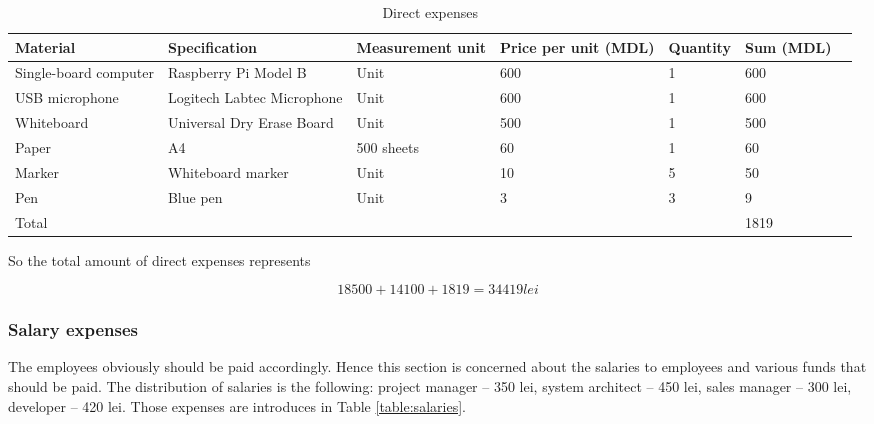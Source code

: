 \begin{table}[!ht]
\begin{center}
\caption{Direct expenses}
\begin{tabularx}{\textwidth}{| M{5em} | Y | M{7em} | M{5em} | M{5em} | M{5em} |N}
\hline
\textbf{Material} & \textbf{Specification} & \textbf{Measurement unit} & \textbf{Price per unit (MDL)} & \textbf{Quantity} & \textbf{Sum (MDL)} &\\[18pt]
\hline
Single-board computer & Raspberry Pi Model B  & Unit & 600 & 1 & 600 &\\[14pt]
\hline
USB microphone & Logitech Labtec Microphone & Unit & 600 & 1 & 600 &\\[14pt]
\hline
Whiteboard & Universal Dry Erase Board & Unit & 500 & 1 & 500 &\\[14pt]
\hline
Paper & A4 & 500 sheets & 60 & 1 & 60 &\\[14pt]
\hline
Marker & Whiteboard marker & Unit & 10 & 5 & 50 &\\[14pt]
\hline
Pen & Blue pen & Unit & 3 & 3 & 9 &\\[14pt]
\hline
Total & & & & & 1819 &\\[14pt]
\hline
\end{tabularx}
\label{table:direct_expenses}
\end{center}
\end{table}

\newpage
So the total amount of direct expenses represents 

\begin{equation}
 18500 + 14100 + 1819 = 34419 lei
\end{equation}

\subsubsection{Salary expenses}
The employees obviously should be paid accordingly. Hence this section is concerned about the salaries to employees and various funds that should be paid. The distribution of salaries is the following: project manager -- 350 lei, system architect -- 450 lei, sales manager -- 300 lei, developer -- 420 lei. Those expenses are introduces in Table \ref{table:salaries}.

